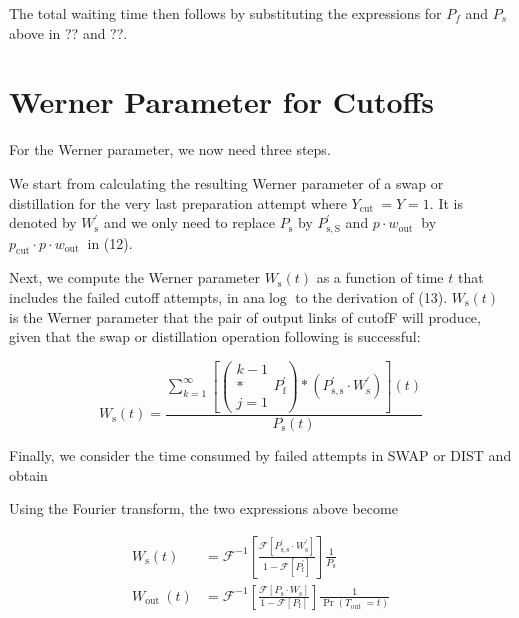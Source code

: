 \documentclass{masterthesis}
\begin{document}
The total waiting time then follows by substituting the expressions for $P_{f}$ and $P_{s}$ above in ?? and ??.


\section*{Werner Parameter for Cutoffs}
For the Werner parameter, we now need three steps.

We start from calculating the resulting Werner parameter of a swap or distillation for the very last preparation attempt where $Y_{\text {cut }}=Y=1$. It is denoted by $W_{\mathrm{s}}^{\prime}$ and we only need to replace $P_{\mathrm{s}}$ by $P_{\mathrm{s}, \mathrm{S}}^{\prime}$ and $p \cdot w_{\text {out }}$ by $p_{\mathrm{cut}} \cdot p \cdot w_{\text {out }}$ in (12).

Next, we compute the Werner parameter $W_{\mathrm{s}}(t)$ as a function of time $t$ that includes the failed cutoff attempts, in ana$\log$ to the derivation of (13). $W_{\mathrm{s}}(t)$ is the Werner parameter that the pair of output links of cutofF will produce, given that the swap or distillation operation following is successful:

$$
W_{\mathrm{s}}(t)=\frac{\sum_{k=1}^{\infty}\left[\left(\begin{array}{c}
k-1 \\
* \\
j=1
\end{array} P_{\mathrm{f}}^{\prime}\right) *\left(P_{\mathrm{s}, \mathrm{s}}^{\prime} \cdot W_{\mathrm{s}}^{\prime}\right)\right](t)}{P_{\mathrm{s}}(t)}
$$

Finally, we consider the time consumed by failed attempts in SWAP or DIST and obtain


Using the Fourier transform, the two expressions above become

$$
\begin{aligned}
W_{\mathrm{s}}(t) & =\mathcal{F}^{-1}\left[\frac{\mathcal{F}\left[P_{\mathrm{s}, \mathrm{s}}^{\prime} \cdot W_{\mathrm{s}}^{\prime}\right]}{1-\mathcal{F}\left[P_{\mathrm{f}}^{\prime}\right]}\right] \frac{1}{P_{\mathrm{s}}} \\
W_{\text {out }}(t) & =\mathcal{F}^{-1}\left[\frac{\mathcal{F}\left[P_{\mathrm{s}} \cdot W_{\mathrm{s}}\right]}{1-\mathcal{F}\left[P_{\mathrm{f}}\right]}\right] \frac{1}{\operatorname{Pr}\left(T_{\text {out }}=t\right)}
\end{aligned}
$$
\end{document}

